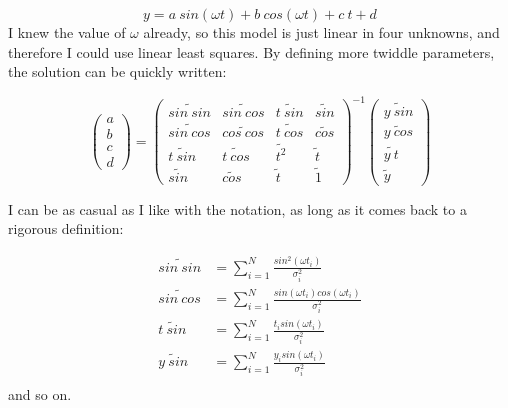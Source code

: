 \documentclass[letterpaper,12pt]{article}
\begin{document}
\begin{equation} \label{eq.sincosmodel}
y = a\ sin(\omega t)+ b\ cos(\omega t)+c\ t + d
\end{equation}
I knew the value of $\omega$ already, so this model is just linear in four unknowns, and therefore I could use linear least squares. By defining more twiddle parameters, the solution can be quickly written:

\begin{equation} \label{eq.sincos}
\begin{pmatrix}
a \\
b \\
c \\
d
\end{pmatrix} =
\begin{pmatrix}
\widetilde{sin\ sin} & \widetilde{sin\ cos} & \widetilde{t\ sin} & \widetilde{sin} \\
\widetilde{sin\ cos} & \widetilde{cos\ cos} & \widetilde{t\ cos} & \widetilde{cos} \\
\widetilde{t\ sin} & \widetilde{t\ cos} & \widetilde{t^2} & \widetilde{t} \\
\widetilde{sin} & \widetilde{cos} & \widetilde{t} & \widetilde{1} 
\end{pmatrix} ^{-1}
\begin{pmatrix}
\widetilde{y\ sin}  \\
\widetilde{y\ cos}  \\
\widetilde{y\ t}  \\
\widetilde{y}
\end{pmatrix}
\end{equation}

I can be as casual as I like with the notation, as long as it comes back to a rigorous definition:

\begin{equation}
\begin{aligned}
\label{twiddle3}
\widetilde{sin\ sin}&=\sum_{i=1}^N \frac{sin^2(\omega t_i)}{\sigma_i^2}\\
\widetilde{sin\ cos}&=\sum_{i=1}^N \frac{sin(\omega t_i)cos(\omega t_i)}{\sigma_i^2}\\
\widetilde{t\ sin}&=\sum_{i=1}^N \frac{t_i sin(\omega t_i)}{\sigma_i^2}\\
\widetilde{y\ sin}&=\sum_{i=1}^N \frac{y_i sin(\omega t_i)}{\sigma_i^2}\\
\end{aligned}
\end{equation}
and so on.
\end{document}
